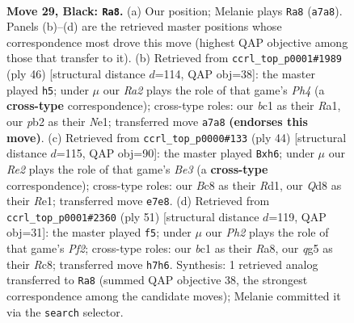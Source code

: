 \documentclass[11pt]{article}
\begin{document}
\clearpage

\begin{figure}[p]\centering
\begin{subfigure}{0.46\textwidth}\centering
\resizebox{\linewidth}{!}{%
\newchessgame
\chessboard[
  setfen={2bq2k1/rp1pr1bp/p3p3/2P2pQB/P1nP3P/2N2N2/1P3PK1/R1B2R2 b - - 3 29},
  showmover=false,
  pgfstyle=straightmove, color=movearrow, markmove={a7-a8}
]}
\caption{}
\end{subfigure}\hfill
\begin{subfigure}{0.46\textwidth}\centering
\resizebox{\linewidth}{!}{%
\newchessgame
\chessboard[
  setfen={3r2k1/1pr2pp1/3b2qp/p2pB3/1n2b2P/1P2P1PB/P2RQP1K/R3N3 w - - 4 24},
  showmover=false,
  pgfstyle=straightmove, color=movearrow, markmove={h4-h5}
]}
\caption{}
\end{subfigure}
\\[4pt]
\begin{subfigure}{0.46\textwidth}\centering
\resizebox{\linewidth}{!}{%
\newchessgame
\chessboard[
  setfen={r3rbk1/5pp1/2p1bpnp/p3q3/2P5/3BB1NP/P1Q2PP1/3RR1K1 w - - 2 23},
  showmover=false,
  pgfstyle=straightmove, color=movearrow, markmove={e3-h6}
]}
\caption{}
\end{subfigure}\hfill
\begin{subfigure}{0.46\textwidth}\centering
\resizebox{\linewidth}{!}{%
\newchessgame
\chessboard[
  setfen={r1rb2k1/1p1nqpp1/4p2p/1P1b4/p1NB1P2/P2QP2P/6PK/1BR2R2 b - - 4 26},
  showmover=false,
  pgfstyle=straightmove, color=movearrow, markmove={f7-f5}
]}
\caption{}
\end{subfigure}
\caption{\textbf{Move 29, Black: \texttt{Ra8}.} (a) Our position; Melanie plays \texttt{Ra8} (\texttt{a7a8}). Panels (b)--(d) are the retrieved master positions whose correspondence most drove this move (highest QAP objective among those that transfer to it). (b) Retrieved from \texttt{ccrl\_top\_p0001\#1989} (ply 46) [structural distance $d$=114, QAP obj=38]: the master played \texttt{h5}; under $\mu$ our \emph{Ra2} plays the role of that game's \emph{Ph4} (a \textbf{cross-type} correspondence); cross-type roles: our \emph{b}c1 as their \emph{R}a1, our \emph{p}b2 as their \emph{N}e1; transferred move \texttt{a7a8} \textbf{(endorses this move)}. (c) Retrieved from \texttt{ccrl\_top\_p0000\#133} (ply 44) [structural distance $d$=115, QAP obj=90]: the master played \texttt{Bxh6}; under $\mu$ our \emph{Re2} plays the role of that game's \emph{Be3} (a \textbf{cross-type} correspondence); cross-type roles: our \emph{B}c8 as their \emph{R}d1, our \emph{Q}d8 as their \emph{R}e1; transferred move \texttt{e7e8}. (d) Retrieved from \texttt{ccrl\_top\_p0001\#2360} (ply 51) [structural distance $d$=119, QAP obj=31]: the master played \texttt{f5}; under $\mu$ our \emph{Ph2} plays the role of that game's \emph{Pf2}; cross-type roles: our \emph{b}c1 as their \emph{R}a8, our \emph{q}g5 as their \emph{R}c8; transferred move \texttt{h7h6}. Synthesis: 1 retrieved analog transferred to \texttt{Ra8} (summed QAP objective 38, the strongest correspondence among the candidate moves); Melanie committed it via the \texttt{search} selector.}
\label{fig:thought-m57}
\end{figure}
\end{document}
